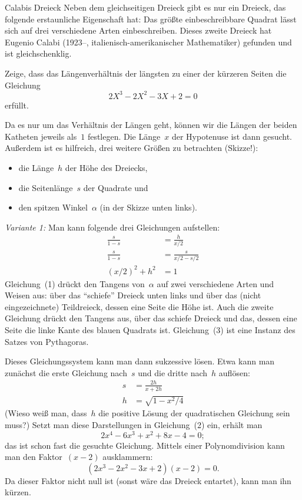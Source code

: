 \documentclass{algblatt}
\begin{document}
\begin{aufgabe}{Calabis Dreieck}
Neben dem gleichseitigen Dreieck gibt es nur ein Dreieck, das folgende erstaunliche
Eigenschaft hat: Das größte 
einbeschreibbare Quadrat lässt sich auf drei verschiedene Arten einbeschreiben.
Dieses zweite Dreieck hat Eugenio Calabi (1923--, italienisch-amerikanischer
Mathematiker) gefunden und ist gleichschenklig.

Zeige, dass das Längenverhältnis der längsten zu einer der kürzeren Seiten die
Gleichung
\[ 2 X^3 - 2 X^2 - 3 X + 2 = 0 \]
erfüllt. \ifloesungen\else\\[1em]\fi

\begin{center}
  \scalebox{0.5}{}
\end{center}

\begin{loesung}\addtolength{\jot}{0.3em}%
Da es nur um das Verhältnis der Längen geht, können wir die Längen der
beiden Katheten jeweils als~$1$ festlegen. Die Länge~$x$ der Hypotenuse ist
dann gesucht. Außerdem ist es hilfreich, drei weitere Größen zu betrachten
(Skizze!):
\begin{itemize}
\item die Länge~$h$ der Höhe des Dreiecks,
\item die Seitenlänge~$s$ der Quadrate und
\item den spitzen Winkel~$\alpha$ (in der Skizze unten links).
\end{itemize}
\emph{Variante 1:} Man kann folgende drei Gleichungen aufstellen:
\begin{align}
  \frac{s}{1 - s} &= \frac{h}{x/2} \\
  \frac{s}{1 - s} &= \frac{s}{x/2 - s/2} \\
  (x/2)^2 + h^2 &= 1
\end{align}
Gleichung~(1) drückt den Tangens von~$\alpha$ auf zwei verschiedene Arten und
Weisen aus: über das "`schiefe"' Dreieck unten links und über das (nicht
eingezeichnete) Teildreieck, dessen eine Seite die Höhe ist. Auch die zweite
Gleichung drückt den Tangens aus, über das schiefe Dreieck und das, dessen eine
Seite die linke Kante des blauen Quadrats ist. Gleichung~(3) ist eine Instanz
des Satzes von Pythagoras.

Dieses Gleichungssystem kann man dann sukzessive lösen. Etwa kann man zunächst
die erste Gleichung nach~$s$ und die dritte nach~$h$ auflösen:
\begin{align*}
  s &= \frac{2h}{x + 2h} \\
  h &= \sqrt{1 - x^2/4}
\end{align*}
(Wieso weiß man, dass~$h$ die positive Lösung der quadratischen Gleichung sein
muss?) Setzt man diese Darstellungen in Gleichung~(2) ein, erhält man
\[ 2x^4 - 6x^3 + x^2 + 8x - 4 = 0; \]
das ist schon fast die gesuchte Gleichung. Mittels einer Polynomdivision kann
man den Faktor~$(x-2)$ ausklammern:
\[ (2x^3 - 2x^2 - 3x + 2) (x-2) = 0. \]
Da dieser Faktor nicht null ist (sonst wäre das Dreieck entartet), kann man ihn
kürzen.


\end{loesung}
\end{aufgabe}
\end{document}
